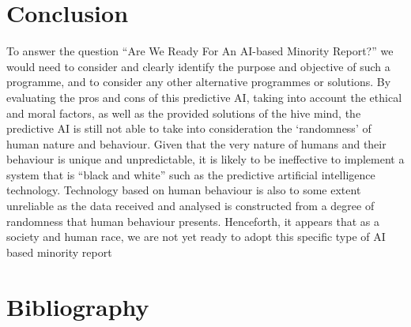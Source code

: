 \documentclass{article}
\begin{document}
\section{Conclusion}
To answer the question “Are We Ready For An AI-based Minority Report?” we would need to consider and clearly identify the purpose and objective of such a programme, and to consider any other alternative programmes or solutions. By evaluating the pros and cons of this predictive AI, taking into account the ethical and moral factors, as well as the provided solutions of the hive mind, the predictive AI is still not able to take into consideration the ‘randomness’ of human nature and behaviour. Given that the very nature of humans and their behaviour is unique and unpredictable, it is likely to be ineffective to implement a system that is “black and white” such as the predictive artificial intelligence technology. Technology based on human behaviour is also to some extent unreliable as the data received and analysed is constructed from a degree of randomness that human behaviour presents. Henceforth, it appears that as a society and human race, we are not yet ready to adopt this specific type of AI based minority report



\section*{Bibliography}
\printbibliography


\end{document}
